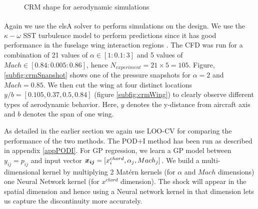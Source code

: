 \begin{figure}[!ht]
  \centering
  \quad
  \caption{CRM shape for aerodynamic simulations}
\end{figure}

Again we use the elsA\textsuperscript{\textregistered} solver to perform simulations on the design. We use the $\kappa - \omega$ SST turbulence model to perform predictions since it has good performance in the fuselage wing interaction regions \cite{menter2003ten, vassberg2014summary}. The CFD was run for a combination of 21 values of $\alpha \in [1: 0.1: 3]$ and 5 values of $Mach \in [0.84: 0.005: 0.86]$, hence $N_{experiment} = 21\times5 = 105$. Figure, \ref{subfig:crmSnapshot} shows one of the pressure snapshots for $\alpha = 2$ and $Mach = 0.85$. We then cut the wing at four distinct locations $y/b = [0.105, 0.37, 0.5, 0.84]$ (figure \ref{subfig:crmWing}) to clearly observe different types of aerodynamic behavior. Here, $y$ denotes the y-distance from aircraft axis and $b$ denotes the span of one wing. 

As detailed in the earlier section we again use LOO-CV for comparing the performance of the two methods. The POD+I method has been run as described in appendix \ref{appPODI}. For GP regression, we learn a GP model between $y_{ij} = p_{ij}$ and input vector $\boldsymbol{x_{ij}} = [x^{chord}_i, \alpha_j, Mach_j]$. We build a multi-dimensional kernel by multiplying 2 Mat\'ern kernels (for $\alpha$ and $Mach$ dimensions) one Neural Network kernel (for $x^{chord}$ dimension). The shock will appear in the spatial dimension and hence using a Neural network kernel in that dimension lets us capture the discontinuity more accurately. 

